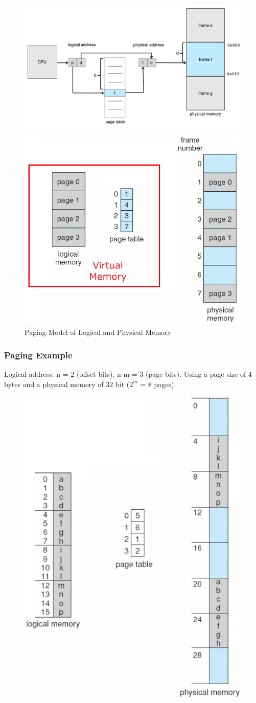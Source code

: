 \begin{figure}[htbp]
    \centering
    \includegraphics[width=0.6\linewidth]{img/nfg.png}
\end{figure}

\begin{figure}[htbp]
    \centering
    \includegraphics[width=0.5\linewidth]{img/dsf.png}
    \caption{Paging Model of Logical and Physical Memory}
\end{figure}

\newpage
\subsubsection{Paging Example}

Logical address: n = 2 (offset bits), n-m = 3 (page bits). Using a page size of 4 bytes and a physical memory of 32 bit ($2^m$ = 8 pages).

\begin{figure}[htbp]
    \centering
    \includegraphics[width=0.5\linewidth]{img/jmy.png}
\end{figure}


